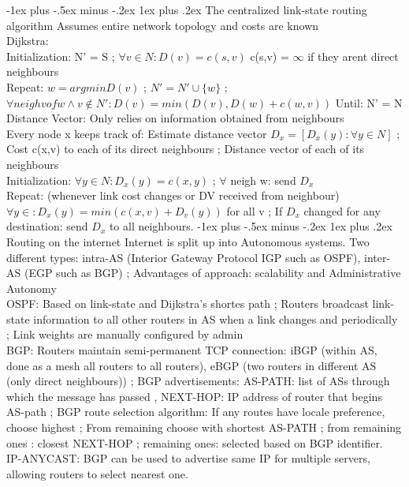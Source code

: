 \documentclass[10pt,landscape]{article}
\makeatletter
\renewcommand{\subsubsection}{\@startsection{subsubsection}{3}{0mm}%
	{-1ex plus -.5ex minus -.2ex}%
	{1ex plus .2ex}%
	{\normalfont\small\bfseries}}
\makeatother
\begin{document}
\begin{multicols}{3}
		\subsubsection{The centralized link-state routing algorithm}
		Assumes entire network topology and costs are known \\
		Dijkstra:\\ 
		Initialization: N' = {S} ; $\forall v \in N: D(v) = c(s,v)$ c(s,v) = $\infty$ if they arent direct neighbours\\
		Repeat: $w = argmin D(v)$ ; $N' =  N' \cup \{w\}$ ; $\forall neigh v of w \wedge v \notin N': D(v) = min(D(v), D(w) + c(w,v))$
		Until: N' = N \\
		Distance Vector: Only relies on information obtained from neighbours \\
		Every node x keeps track of: Estimate distance vector $D_x = [D_x(y): \forall y \in N]$ ; 
		Cost c(x,v) to each of its direct neighbours ; 
		Distance vector of each of its neighbours \\
		Initialization: $\forall y \in N: D_x(y) = c(x,y)$ ; $\forall$ neigh w: send $D_x$ \\
		Repeat: (whenever link cost changes or DV received from neighbour) $\forall y \in: D_x(y) = min(c(x,v) + D_v(y))$ for all v ;
		If $D_x$ changed for any destination: send $D_x$ to all neighbours.
		\subsubsection{Routing on the internet}
		Internet is split up into Autonomous systems. Two different types: intra-AS (Interior Gateway Protocol IGP such as OSPF), inter-AS (EGP such as BGP) ; Advantages of approach: scalability and Administrative Autonomy \\
		OSPF: Based on link-state and Dijkstra's shortes path ; Routers broadcast link-state information to all other routers in AS when a link changes and periodically ; Link weights are manually configured by admin \\
		BGP: Routers maintain semi-permanent TCP connection: iBGP (within AS, done as a mesh all routers to all routers), eBGP (two routers in different AS (only direct neighbours)) ; 
		BGP advertisements: AS-PATH: list of ASs through which the message has passed , NEXT-HOP: IP address of router that begins AS-path ;
		BGP route selection algorithm: If any routes have locale preference, choose highest ; From remaining choose with shortest AS-PATH ; from remaining ones : closest NEXT-HOP ; remaining ones: selected based on BGP identifier. \\
		IP-ANYCAST: BGP can be used to advertise same IP for multiple servers, allowing routers to select nearest one.

\end{multicols}
\end{document}
